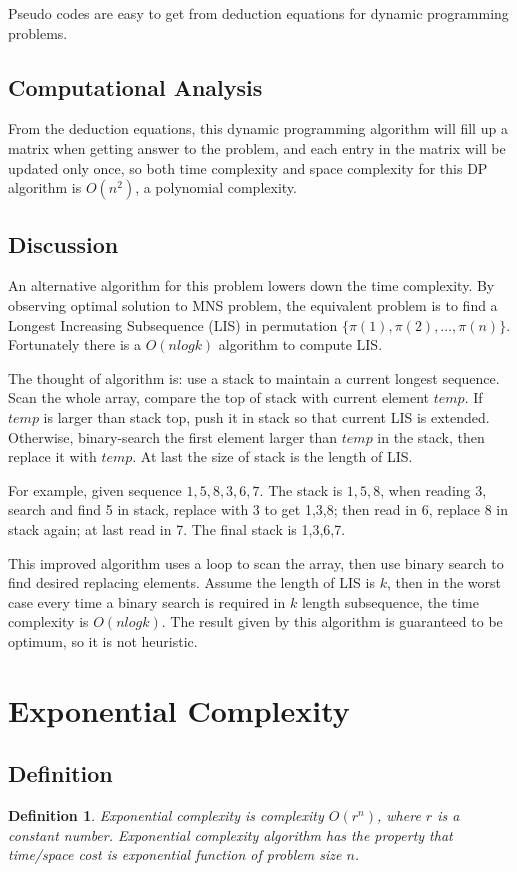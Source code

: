\documentclass[11pt,twoside, onecolumn]{IEEEtran}
\newtheorem{Definition}{Definition}[section]
\begin{document}
Pseudo codes are easy to get from deduction equations for dynamic programming problems. 
\subsection{Computational Analysis}
From the deduction equations, this dynamic programming algorithm will fill up a matrix when getting
answer to the problem, and each entry in the matrix will be updated only once, so both time complexity
and space complexity for this DP algorithm is $O(n^2)$, a polynomial complexity.

\subsection{Discussion}
\label{sec:LIS}
An alternative algorithm for this problem lowers down the time complexity.
By observing optimal solution to MNS problem, the equivalent problem is to find a Longest Increasing
Subsequence (LIS) in permutation $\{\pi(1),\pi(2),\dots,\pi(n)\}$. Fortunately there is a $O(nlogk)$
algorithm to compute LIS. 

The thought of algorithm is: use a stack to maintain a current longest sequence. Scan the whole array,
compare the top of stack with current element $temp$. If $temp$ is larger than stack top, push it in
stack so that current LIS is extended. Otherwise, binary-search the first element larger than $temp$
in the stack, then replace it with $temp$. At last the size of stack is the length of LIS.

For example, given sequence $1,5,8,3,6,7$. The stack is $1,5,8$, when reading 3, search and find 5 in
stack, replace with 3 to get 1,3,8; then read in 6, replace 8 in stack again; at last read in 7. The
final stack is 1,3,6,7.

This improved algorithm uses a loop to scan the array, then use binary search to find desired replacing
elements. Assume the length of LIS is $k$, then in the worst case every time a binary search is required
in $k$ length subsequence, the time complexity is $O(nlogk)$. The result given by this algorithm is
guaranteed to be optimum, so it is not heuristic. 

\section{Exponential Complexity}
\subsection{Definition}
\begin{Definition}
\emph{Exponential complexity} is complexity $O(r^n)$, where $r$ is a constant number. Exponential complexity
algorithm has the property that time/space cost is exponential function of problem size $n$.
\end{Definition}
\end{document}
